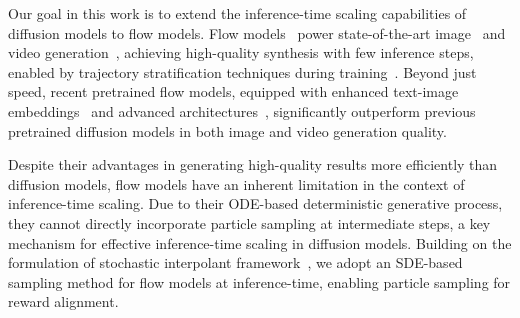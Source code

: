 Our goal in this work is to extend the inference-time scaling capabilities of diffusion models to flow models. 
Flow models~\cite{Lipman:2023CFM} power state-of-the-art image~\cite{Esser2403:scaling, BlackForestLabs:2024Flux} and video generation~\cite{chen2025goku, opensora}, achieving high-quality synthesis with few inference steps, enabled by trajectory stratification techniques during training~\cite{Liu:2023RF}. 
Beyond just speed, recent pretrained flow models, equipped with enhanced text-image embeddings~\cite{Raffel:2020t5} and advanced architectures~\cite{Esser2403:scaling}, significantly outperform previous pretrained diffusion models in both image and video generation quality. 


Despite their advantages in generating high-quality results more efficiently than diffusion models, flow models have an inherent limitation in the context of inference-time scaling. Due to their ODE-based deterministic generative process, they cannot directly incorporate particle sampling at intermediate steps, a key mechanism for effective inference-time scaling in diffusion models. Building on the formulation of stochastic interpolant framework~\cite{Albergo:2023Interpolant}, we adopt an SDE-based sampling method for flow models at inference-time, enabling particle sampling for reward alignment. 


